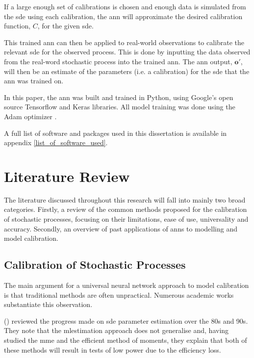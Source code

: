 \documentclass[11pt,oneside,openany,a4paper,english, report, goldenblock
]{usthesis}
\begin{document}
If a large enough set of calibrations is chosen and enough data is simulated from the \acrshort{sde} using each calibration, the \acrshort{ann} will approximate the desired calibration function, $C$, for the given \acrshort{sde}.


This trained \acrshort{ann} can then be applied to real-world observations to calibrate the relevant \acrshort{sde} for the observed process.  This is done by inputting the data observed from the real-word stochastic process into the trained \acrshort{ann}. The \acrshort{ann} output, $\mathbf{o'}$, will then be an estimate of the parameters (i.e. a calibration) for the \acrshort{sde} that the \acrshort{ann} was trained on.


In this paper, the \acrshort{ann} was built and trained in Python, using Google's open source Tensorflow\texttrademark \xspace \citep{tensorflow2015-whitepaper} and Keras \citep{chollet2015keras} libraries. All model training was done using the Adam optimizer \citep{adam}.

A full list of software and packages used in this dissertation is available in appendix \ref{list_of_software_used}.

\chapter{Literature Review}
\label{chapter:literature_review}
The literature discussed throughout this research will fall into mainly two broad categories. Firstly, a review of the common methods proposed for the calibration of stochastic processes, focusing on their limitations, ease of use, universality and accuracy. Secondly, an overview of past applications of \acrshort{ann}s to modelling and model calibration. 

\section{Calibration of Stochastic Processes}
The main argument for a universal neural network approach to model calibration is that traditional methods are often unpractical. Numerous academic works substantiate this observation.


 (\citeyear{Nielsen}) reviewed the progress made on \acrshort{sde} parameter estimation over the 80s and 90s. They note that the \acrshort{mlestimation} approach does not generalise and, having studied the \acrshort{mme} and the efficient method of moments, they explain that both of these methods will result in tests of low power due to the efficiency loss.
\end{document}
